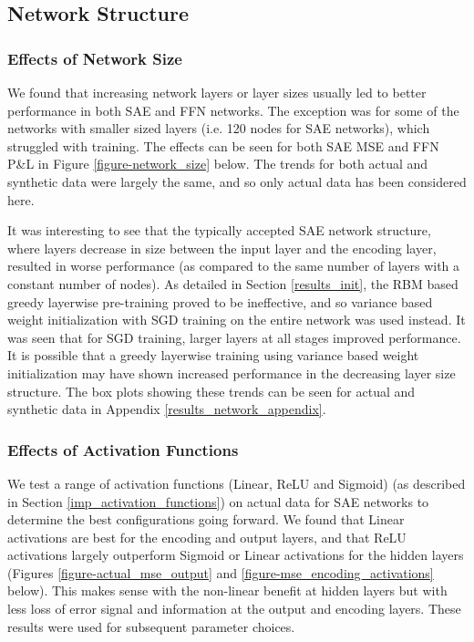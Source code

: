 \documentclass[a4paper,11pt,oneside]{article}
\theoremstyle{plain}
\theoremstyle{definition}
\begin{document}
	\newpage

	\subsection{Network Structure}\label{results_network}
	
	\subsubsection{Effects of Network Size}
	
	We found that increasing network layers or layer sizes usually led to better performance in both SAE and FFN networks. The exception was for some of the networks with smaller sized layers (i.e. 120 nodes for SAE networks), which struggled with training. The effects can be seen for both SAE MSE and FFN P\&L in Figure \ref{figure-network_size} below. The trends for both actual and synthetic data were largely the same, and so only actual data has been considered here.
	
	It was interesting to see that the typically accepted SAE network structure, where layers decrease in size between the input layer and the encoding layer, resulted in worse performance (as compared to the same number of layers with a constant number of nodes). As detailed in Section \ref{results_init}, the RBM based greedy layerwise pre-training proved to be ineffective, and so variance based weight initialization with SGD training on the entire network was used instead. It was seen that for SGD training, larger layers at all stages improved performance. It is possible that a greedy layerwise training using variance based weight initialization may have shown increased performance in the decreasing layer size structure. The box plots showing these trends can be seen for actual and synthetic data in Appendix \ref{results_network_appendix}.
	
	\subsubsection{Effects of Activation Functions}\label{results_activations_scaling}
	
	We test a range of activation functions (Linear, ReLU and Sigmoid) (as described in Section \ref{imp_activation_functions}) on actual data for SAE networks to determine the best configurations going forward. We found that Linear activations are best for the encoding and output layers, and that ReLU activations largely outperform Sigmoid or Linear activations for the hidden layers (Figures \ref{figure-actual_mse_output} and \ref{figure-mse_encoding_activations} below). This makes sense with the non-linear benefit at hidden layers but with less loss of error signal and information at the output and encoding layers. These results were used for subsequent parameter choices.
	
\end{document}
